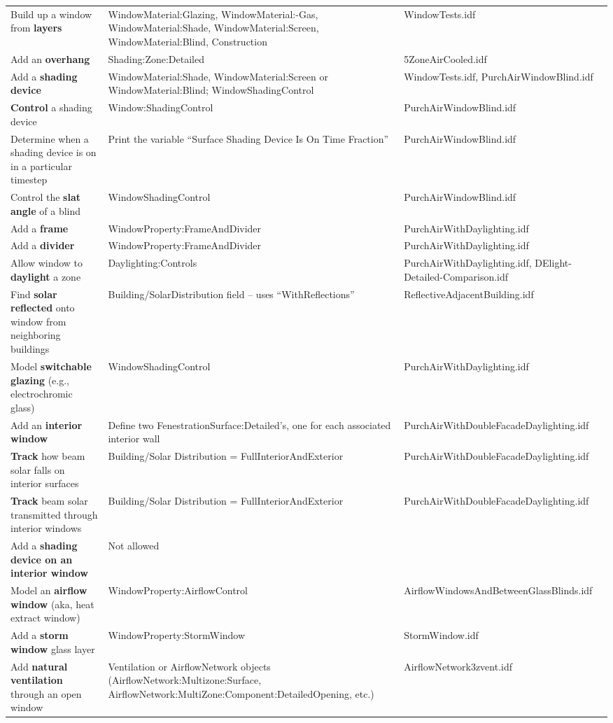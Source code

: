 \begin{longtable}[c]{p{2.0in}p{2.0in}p{2.0in}}
Build up a window from \textbf{layers} & Window\-Material:\-Glazing, Window\-Material:-Gas, Window\-Material:\-Shade, Window\-Material:\-Screen, Window\-Material:\-Blind, Construction & Window\-Tests.idf \tabularnewline
Add an \textbf{overhang} & Shading:\-Zone:\-Detailed & 5Zone\-Air\-Cooled.idf \tabularnewline
Add a \textbf{shading device} & Window\-Material:\-Shade, Window\-Material:\-Screen or Window\-Material:\-Blind; Window\-Shading\-Control & Window\-Tests.idf, Purch\-Air\-Window\-Blind.idf \tabularnewline
\textbf{Control} a shading device & Window:\-Shading\-Control & Purch\-Air\-WindowBlind.idf \tabularnewline
Determine when a shading device is on in a particular timestep & Print the variable ``Surface Shading Device Is On Time Fraction'' & Purch\-Air\-Window\-Blind.idf \tabularnewline
Control the \textbf{slat angle} of a blind & Window\-Shading\-Control & Purch\-Air\-Window\-Blind.idf \tabularnewline
Add a \textbf{frame} & Window\-Property:\-FrameAndDivider & Purch\-Air\-With\-Day\-lighting.idf \tabularnewline
Add a \textbf{divider} & Window\-Property:\-Frame\-And\-Divider & Purch\-Air\-With\-Day\-lighting.idf \tabularnewline
Allow window to \textbf{daylight} a zone & Day\-lighting:Controls & Purch\-Air\-With\-Day\-lighting.idf, DElight-\-Detailed-\-Comparison.idf \tabularnewline
Find \textbf{solar reflected} onto window from neighboring buildings & Building/\-Solar\-Distribution field – uses ``WithReflections'' & Reflective\-Adjacent\-Building.idf \tabularnewline
Model \textbf{switchable glazing} (e.g., electrochromic glass) & Window\-Shading\-Control & Purch\-Air\-With\-Day\-lighting.idf \tabularnewline
Add an \textbf{interior window} & Define two Fenestration\-Surface:\-Detailed's, one for each associated interior wall & Purch\-Air\-With\-Double\-Facade\-Day\-lighting.idf \tabularnewline
\textbf{Track} how beam solar falls on interior surfaces & Building/\-Solar Distribution = Full\-Interior\-And\-Exterior & Purch\-Air\-With\-Double\-Facade\-Day\-lighting.idf \tabularnewline
\textbf{Track} beam solar transmitted through interior windows & Building/Solar Distribution = Full\-Interior\-And\-Exterior & Purch\-Air\-With\-Double\-Facade\-Day\-lighting.idf \tabularnewline
Add a \textbf{shading device on an interior window} & Not allowed & \tabularnewline
Model an \textbf{airflow window} (aka, heat extract window) & Window\-Property:\-Air\-flow\-Control & Air\-flow\-Windows\-And\-Between\-Glass\-Blinds.idf \tabularnewline
Add a \textbf{storm window} glass layer & Window\-Property:\-Storm\-Window & Storm\-Window.idf \tabularnewline
Add \textbf{natural ventilation} through an open window & Ventilation or Airflow\-Network objects (Airflow\-Network:\-Multizone:\-Surface, Airflow\-Network:\-Multi\-Zone:\-Component:\-Detailed\-Opening, etc.) & Airflow\-Network\-3zvent.idf \tabularnewline

\end{longtable}
